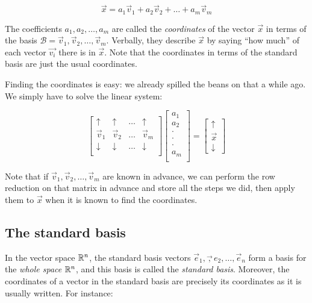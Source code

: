 \documentclass[10pt]{amsart}
\begin{document}
$$\vec{x} = a_1\vec{v}_1 + a_2\vec{v}_2 + \dots + a_m\vec{v}_m$$

The coefficients $a_1,a_2,\dots,a_m$ are called the {\em coordinates}
of the vector $\vec{x}$ in terms of the basis $\mathcal{B} =
\vec{v}_1,\vec{v}_2,\dots,\vec{v}_m$. Verbally, they describe
$\vec{x}$ by saying ``how much'' of each vector $\vec{v_i}$ there is
in $\vec{x}$. Note that the coordinates in terms of the standard basis
are just the usual coordinates.

Finding the coordinates is easy: we already spilled the beans on that
a while ago. We simply have to solve the linear system:

$$\left[\begin{matrix} \uparrow & \uparrow & \dots & \uparrow \\ \vec{v}_1 & \vec{v}_2 & \dots & \vec{v}_m \\ \downarrow & \downarrow & \dots & \downarrow \\\end{matrix}\right]\left[\begin{matrix} a_1 \\ a_2 \\ \cdot \\ \cdot \\ \cdot \\ a_m \\\end{matrix}\right] = \left[\begin{matrix} \uparrow \\ \vec{x} \\ \downarrow \end{matrix}\right]$$

Note that if $\vec{v}_1,\vec{v}_2,\dots,\vec{v}_m$ are known in
advance, we can perform the row reduction on that matrix in advance
and store all the steps we did, then apply them to $\vec{x}$ when it
is known to find the coordinates.

\subsection{The standard basis}

In the vector space $\mathbb{R}^n$, the standard basis vectors
$\vec{e}_1,\vec,{e_2},\dots,\vec{e}_n$ form a basis for the {\em whole
  space} $\mathbb{R}^n$, and this basis is called the {\em standard
  basis}. Moreover, the coordinates of a vector in the standard basis
are precisely its coordinates as it is usually written. For instance:
\end{document}
